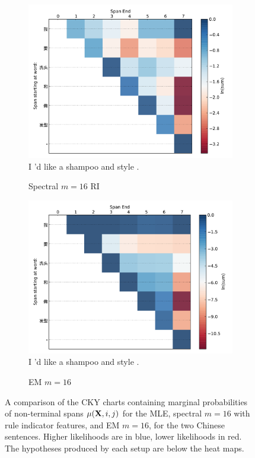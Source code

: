 \documentclass[11pt]{article}
\newcommand{\bX}{{\bf X}}
\begin{document}
\begin{figure}[t!]
\begin{center}
\begin{subfigure}{0.67\columnwidth}
		\label{fig:mle1}			
	\end{subfigure}
	\begin{subfigure}{0.67\columnwidth}
		\centering
		\includegraphics[width=1.1\columnwidth,keepaspectratio=true]{./spec1.pdf}		
		I 'd like a shampoo and style .
		\caption {\small Spectral $m=16$ RI}
		\label{fig:spec1}
	\end{subfigure}
	\begin{subfigure}{0.67\columnwidth}
		\centering
		\includegraphics[width=1.1\columnwidth,keepaspectratio=true]{./em1.pdf}		
		I 'd like a shampoo and style .
		\caption {\small EM $m=16$}
		\label{fig:em1}
	\end{subfigure}
	\end{center}	
	\caption{\small A comparison of the CKY charts containing marginal probabilities of non-terminal spans $\mu(\bX, i, j)$ for the MLE, spectral $m=16$ with rule indicator features, and EM $m=16$, for the two Chinese sentences.  
	Higher likelihoods are in blue, lower likelihoods in red. 
	The hypotheses produced by each setup are below the heat maps.}
	\label{fig:heatmaps}
\end{figure}
\end{document}
